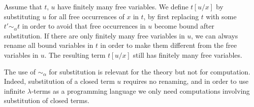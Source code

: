 %
%
%
%
%




Assume that $t$, $u$ have finitely many free variables. 
We define $t[u/x]$ by substituting $u$ for all free occurrences of $x$ in $t$, 
by first replacing $t$ with some $t' \sim_\alpha t$
in order to avoid that free occurrences in $u$ become bound after substitution. 
If there are only finitely many free variables in $u$, we can always
rename all bound variables in $t$ in order to make them different from the free variables
in $u$. The resulting term $t[u/x]$ still has finitely many free variables.

The use of $\sim_\alpha$ for substitution is relevant for the theory but not
for computation. Indeed,
substitution of a closed term $u$ requires no renaming, and  in order to use 
infinite $\lambda$-terms as a programming language we only need computations 
involving substitution of closed terms. 


